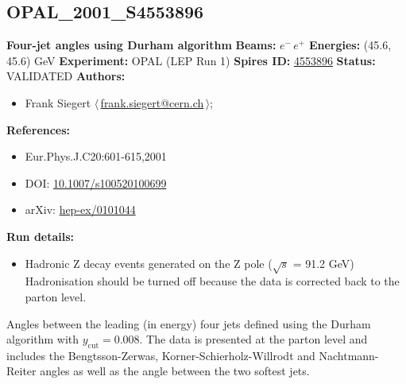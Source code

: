 \subsection[OPAL\_2001\_S4553896]{OPAL\_2001\_S4553896\,\cite{Abbiendi:2001qn}}
\textbf{Four-jet angles using Durham algorithm}\newline
\textbf{Beams:} $e^-$\,$e^+$ \newline
\textbf{Energies:} (45.6, 45.6) GeV \newline
\textbf{Experiment:} OPAL (LEP Run 1) \newline
\textbf{Spires ID:} \href{http://www.slac.stanford.edu/spires/find/hep/www?rawcmd=key+4553896}{4553896}\newline
\textbf{Status:} VALIDATED\newline
\textbf{Authors:}
\begin{itemize}
  \item Frank Siegert $\langle\,$\href{mailto:frank.siegert@cern.ch}{frank.siegert@cern.ch}$\,\rangle$;
\end{itemize}
\textbf{References:}
\begin{itemize}
  \item Eur.Phys.J.C20:601-615,2001
  \item DOI: \href{http://dx.doi.org/10.1007/s100520100699}{10.1007/s100520100699}
  \item arXiv: \href{http://arxiv.org/abs/hep-ex/0101044}{hep-ex/0101044}
\end{itemize}
\textbf{Run details:}
\begin{itemize}

  \item Hadronic Z decay events generated on the Z pole (\ensuremath{\sqrt{s}} = 91.2 GeV) Hadronisation should be turned off because the data is corrected back to the parton level.\end{itemize}

\noindent Angles between the leading (in energy) four jets defined using the Durham algorithm with $y_\mathrm{cut}=0.008$. The data is presented at the parton level and includes the Bengtsson-Zerwas, Korner-Schierholz-Willrodt and Nachtmann-Reiter angles as well as the angle between the two softest jets.

\clearpage


\clearpage

